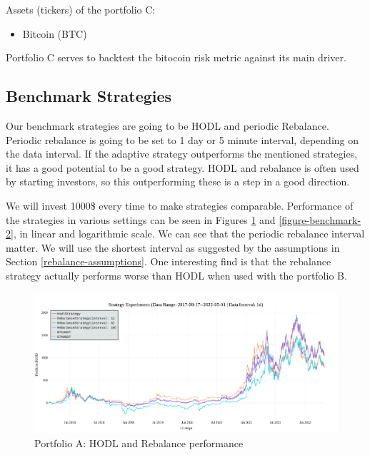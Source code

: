 Assets (tickers) of the portfolio C:
\begin{itemize}
    \item Bitcoin (BTC)
\end{itemize}

Portfolio C serves to backtest the bitocoin risk metric against its main driver.


\subsection*{Benchmark Strategies}
Our benchmark strategies are going to be HODL and periodic Rebalance. Periodic rebalance is going to be set to 1 day or 5 minute interval, depending on the data interval. If the adaptive strategy outperforms the mentioned strategies, it has a good potential to be a good strategy. HODL and rebalance is often used by starting investors, so this outperforming these is a step in a good direction.

We will invest 1000\$ every time to make strategies comparable. Performance of the strategies in various settings can be seen in Figures \ref{figure-benchmark-1} and \ref{figure-benchmark-2}, in linear and logarithmic scale. We can see that the periodic rebalance interval matter. We will use the shortest interval as suggested by the assumptions in Section \ref{rebalance-assumptions}. One interesting find is that the rebalance strategy actually performs worse than HODL when used with the portfolio B.

\begin{figure}[!hbt]
    \centering
    \includegraphics[width=\columnwidth]{figures/benchmark-A.png}
    \caption{Portfolio A: HODL and Rebalance performance}
    \label{figure-benchmark-1}
\end{figure}

